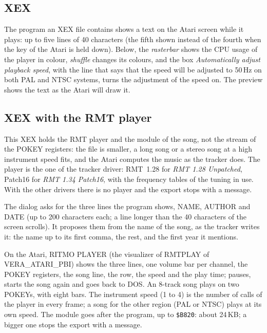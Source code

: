 \subsection{XEX}


The program an XEX file contains shows a text on the Atari screen while it plays: up to five lines of 40 characters (the fifth shown
instead of the fourth when the  key of the Atari is held down). Below, the \emph{rasterbar} shows the CPU usage of the player
in colour, \emph{shuffle} changes its colours, and the box \emph{Automatically adjust playback speed}, with the line that says that the speed will be
adjusted to 50\,Hz on both PAL and NTSC systems, turns the adjustment of the speed on. The preview shows
the text as the Atari will draw it.

\subsection{XEX with the RMT player}


This XEX holds the RMT player and the module of the song, not the stream of the POKEY registers: the file is
smaller, a long song or a stereo song at a high instrument speed fits, and the Atari computes the music as the tracker does.
The player is the one of the tracker driver: RMT~1.28 for \emph{RMT 1.28 Unpatched}, Patch16 for \emph{RMT 1.34 Patch16}, with
the frequency tables of the tuning in use. With the other drivers there is no player and the export stops with a message.

The dialog asks for the three lines the program shows, NAME, AUTHOR and DATE (up to 200 characters each; a line
longer than the 40 characters of the screen scrolls). It proposes them from the name of the song, as the tracker writes it:
the name up to its first comma, the rest, and the first year it mentions.


On the Atari, RITMO PLAYER (the visualizer of RMTPLAY of VERA\_ATARI\_PBI) shows the three lines, one volume bar per
channel, the POKEY registers, the song line, the row, the speed and the play time;  pauses,  starts the
song again and  goes back to DOS. An 8-track song plays on two POKEYs, with eight bars. The instrument speed (1 to
4) is the number of calls of the player in every frame; a song for the other region (PAL or NTSC) plays at its own speed.
The module goes after the program, up to \texttt{\$B820}: about 24\,KB; a bigger one stops the export with a message.

